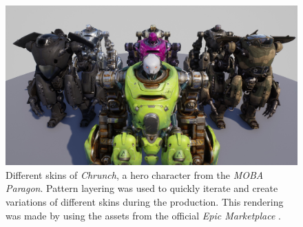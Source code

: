 \begin{figure}
	\centering
	\includegraphics[width=0.9\linewidth]{images/07cha_02_MaterialLayeringVariety.jpg}
	\caption{Different skins of \emph{Chrunch}, a hero character from the \emph{MOBA} \emph{Paragon}. Pattern layering was used to quickly iterate and create variations of different skins during the production. This rendering was made by using the assets from the official \emph{Epic Marketplace} \cite{epic2018chrunch}.}
	\label{fig:materialLayeringVariety}
\end{figure}



